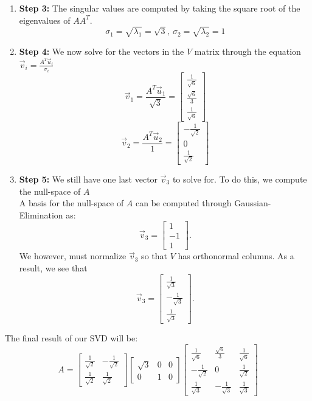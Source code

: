 \begin{enumerate}
{\begin{enumerate}[label=(\roman*)]
        Remember to normalize these vectors since they form the $U$ matrix.
      \item \textbf{Step 3:}
        The singular values are computed by taking the square root of the eigenvalues of $AA^{T}.$
        $$\sigma_{1} = \sqrt{\lambda_{1}} = \sqrt{3}, \ \sigma_{2} = \sqrt{\lambda_{2}} = 1$$
      \item \textbf{Step 4:}
        We now solve for the vectors in the $V$ matrix through the equation $\vec{v}_i = \frac{A^{T} \vec{u}_i}{\sigma_i}$
        $$\vec{v}_{1} = \frac{A^{T} \vec{u}_{1}}{\sqrt{3}} = 
        \begin{bmatrix} \frac{1}{\sqrt{6}} \\ \frac{\sqrt{6}}{3} \\ \frac{1}{\sqrt{6}} \end{bmatrix}$$
        $$\vec{v}_{2} = \frac{A^{T} \vec{u}_{2}}{1} = 
        \begin{bmatrix} -\frac{1}{\sqrt{2}} \\ 0 \\ \frac{1}{\sqrt{2}} \end{bmatrix}$$
      \item \textbf{Step 5:}
        We still have one last vector $\vec{v}_{3}$ to solve for. To do this, we compute the null-space of $A$ \\
        A basis for the null-space of $A$ can be computed through Gaussian-Elimination as:
        $$\vec{v}_{3} = \begin{bmatrix} 1 \\ -1 \\ 1 \end{bmatrix}.$$
        We however, must normalize $\vec{v}_{3}$ so that $V$ has orthonormal columns. As a result, we see that
        $$\vec{v}_{3} = \begin{bmatrix} \frac{1}{\sqrt{3}} \\ - \frac{1}{\sqrt{3}} \\ \frac{1}{\sqrt{3}} \end{bmatrix}.$$
    \end{enumerate}
    The final result of our SVD will be:
    \begin{equation}
      A = \begin{bmatrix} \frac{1}{\sqrt{2}} & -\frac{1}{\sqrt{2}} \\ \frac{1}{\sqrt{2}} & \frac{1}{\sqrt{2}} \end{bmatrix} 
      \begin{bmatrix} \sqrt{3} & 0 & 0 \\ 0 & 1 & 0 \end{bmatrix} 
      \begin{bmatrix} \frac{1}{\sqrt{6}} & \frac{\sqrt{6}}{3} & \frac{1}{\sqrt{6}} \\
      -\frac{1}{\sqrt{2}} & 0 & \frac{1}{\sqrt{2}} \\
      \frac{1}{\sqrt{3}} & - \frac{1}{\sqrt{3}} & \frac{1}{\sqrt{3}} \end{bmatrix}
    \end{equation}
  }


\end{enumerate}
